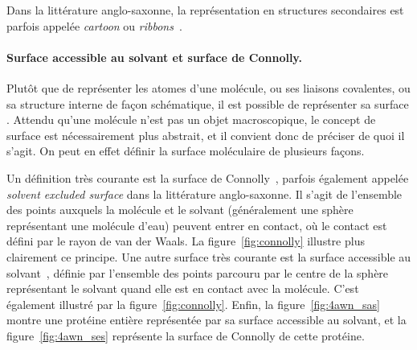 	Dans la littérature anglo-saxonne, la représentation en structures secondaires est parfois appelée \emph{cartoon} ou \emph{ribbons}~\cite{carson1986algorithm, richardson2000early}.
		
		
	\paragraph{Surface accessible au solvant et surface de Connolly.} Plutôt que de représenter les atomes d'une molécule, ou ses liaisons covalentes, ou sa structure interne de façon schématique, il est possible de représenter sa \og surface \fg{}. Attendu qu'une molécule n'est pas un objet macroscopique, le concept de surface est nécessairement plus abstrait, et il convient donc de préciser de quoi il s'agit. On peut en effet définir la surface moléculaire de plusieurs façons.
		
	Un définition très courante est la surface de Connolly~\cite{connolly1983analytical}, parfois également appelée \emph{solvent excluded surface} dans la littérature anglo-saxonne. Il s'agit de l'ensemble des points auxquels la molécule et \og le solvant \fg{} (généralement une sphère représentant une molécule d'eau) peuvent entrer en contact, où le contact est défini par le rayon de van der Waals. La figure~\ref{fig:connolly} illustre plus clairement ce principe. Une autre surface très courante est la surface accessible au solvant~\cite{lee1971interpretation}, définie par l'ensemble des points parcouru par le centre de la sphère représentant le solvant quand elle est en contact avec la molécule. C'est également illustré par la figure~\ref{fig:connolly}. Enfin, la figure~\ref{fig:4awn_sas} montre une protéine entière représentée par sa surface accessible au solvant, et la figure~\ref{fig:4awn_ses} représente la surface de Connolly de cette protéine.
		
